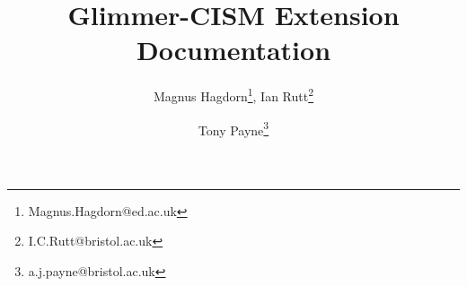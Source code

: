 \newcommand{\dir}{ext}

\pagestyle{myheadings}



\title{Glimmer-CISM {\glimmerver} Extension Documentation}
\author{Magnus Hagdorn\thanks{Magnus.Hagdorn@ed.ac.uk}, Ian
Rutt\thanks{I.C.Rutt@bristol.ac.uk} \and Tony Payne\thanks{a.j.payne@bristol.ac.uk}}

\maketitle
\tableofcontents
\newpage




